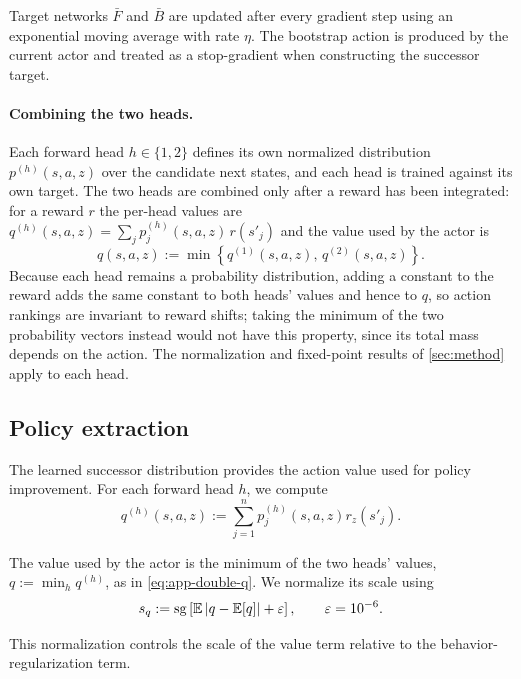Target networks $\bar F$ and $\bar B$ are updated after every gradient step using an exponential moving average with rate $\eta$.
The bootstrap action is produced by the current actor and treated as a stop-gradient when constructing the successor target.

\paragraph{Combining the two heads.}
Each forward head $h\in\{1,2\}$ defines its own normalized distribution $p^{(h)}(s,a,z)$ over the candidate next states, and each head is trained against its own target.
The two heads are combined only after a reward has been integrated: for a reward $r$ the per-head values are $q^{(h)}(s,a,z)=\sum_j p^{(h)}_j(s,a,z)\,r(s'_j)$ and the value used by the actor is
\begin{equation}
    q(s,a,z) := \min\left\{ q^{(1)}(s,a,z),\, q^{(2)}(s,a,z) \right\}. \label{eq:app-double-q}
\end{equation}
Because each head remains a probability distribution, adding a constant to the reward adds the same constant to both heads' values and hence to $q$, so action rankings are invariant to reward shifts; taking the minimum of the two probability vectors instead would not have this property, since its total mass depends on the action.
The normalization and fixed-point results of \cref{sec:method} apply to each head.

\subsection{Policy extraction}
\label{app:actor}

The learned successor distribution provides the action value used for policy improvement.
For each forward head $h$, we compute
\begin{equation}
    q^{(h)}(s,a,z) := \sum_{j=1}^{n} p_j^{(h)}(s,a,z) r_z(s'_j). \label{eq:app-head-value}
\end{equation}

The value used by the actor is the minimum of the two heads' values, $q:=\min_h q^{(h)}$, as in \cref{eq:app-double-q}.
We normalize its scale using
\begin{equation}
    s_q := \mathrm{sg}\left[ \mathbb{E}\left| q-\mathbb{E}[q] \right| + \varepsilon \right], \qquad \varepsilon=10^{-6}. \label{eq:app-value-scale}
\end{equation}

This normalization controls the scale of the value term relative to the behavior-regularization term.


